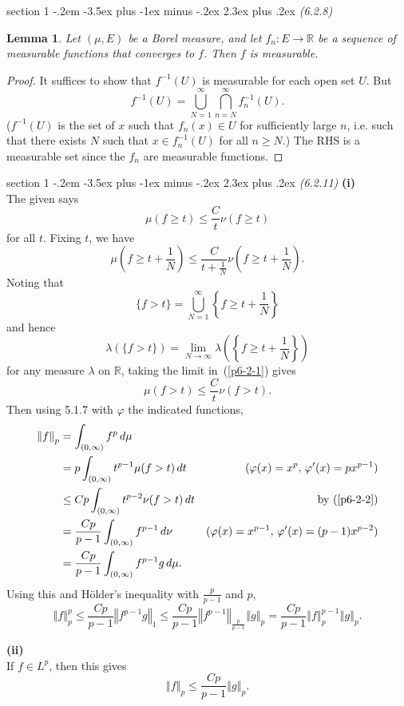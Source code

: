 \documentclass[12pt]{article}
\makeatletter
\theoremstyle{norm}
\newtheorem{lem}[thm]{Lemma}
\newcommand{\R}[0]{\mathbb{R}}
\newcommand{\rc}[1]{\frac{1}{#1}}
\newcommand{\la}[0]{\lambda}
\newcommand{\ph}[0]{\varphi}
\newcommand{\bc}[1]{\left\{ {#1} \right\}}
\newcommand{\pa}[1]{\left( {#1} \right)}
\newcommand{\ve}[1]{\left\Vert {#1}\right\Vert}
\newcommand{\by}[1]{\text{by~(\ref{#1})}}
\newcommand{\subprob}[1]{\noindent\textbf{#1}\\}
\newcommand{\iy}[0]{\infty}
\newenvironment{problem}{\@startsection
       {section}
       {1}
       {-.2em}
       {-3.5ex plus -1ex minus -.2ex}
       {2.3ex plus .2ex}
       {\pagebreak[3]%
       \large\bf\noindent{Problem }
       }
       }
       {%
       }
\makeatother
\begin{document}
\begin{problem}{\it (6.2.8)}
\begin{lem}
Let $(\mu,E)$ be a Borel measure, and let $f_n:E\to \R$ be a sequence of measurable functions that converges to $f$. Then $f$ is measurable.
\end{lem}
\begin{proof}
It suffices to show that $f^{-1}(U)$ is measurable for each open set $U$. But 
\[
f^{-1}(U)=\bigcup_{N=1}^{\iy}\bigcap_{n=N}^{\iy} f_n^{-1}(U).
\]
($f^{-1}(U)$ is the set of $x$ such that $f_n(x)\in U$ for sufficiently large $n$, i.e. such that there exists $N$ such that $x\in f_n^{-1}(U)$ for all $n\ge N$.) The RHS is a measurable set since the $f_n$ are measurable functions. 
\end{proof}
\end{problem}
\begin{problem}{\it (6.2.11)}
\subprob{(i)}
The given says 
\begin{equation}\label{p6-2-0}
\mu(f\ge t)\le \frac Ct\nu(f\ge t)
\end{equation}
for all $t$. Fixing $t$, we have 
\begin{equation}\label{p6-2-1}
\mu(f\ge t+\rc N)\le \frac C{t+\rc N}\nu(f\ge t+\rc N).
\end{equation}
Noting that 
\[\{f>t\}=\bigcup_{N=1}^{\iy} \bc{f\ge t+\rc N}\]
and hence
\[\la(\{f>t\})=\lim_{N\to\iy}\la\pa{\bc{f\ge t+\rc N}}\]
for any measure $\la$ on $\R$, taking the limit in~(\ref{p6-2-1}) gives
\begin{equation}\label{p6-2-2}
\mu(f>t)\le \frac C{t}\nu(f> t).
\end{equation}
Then using 5.1.7 with $\ph$ the indicated functions,
\begin{align*}
\ve{f}_p&=\int_{(0,\iy)} f^p\,d\mu\\
&=p\int_{(0,\iy)}t^{p-1} \mu(f>t)\,dt&(\ph(x)=x^p,\,\ph'(x)=px^{p-1})\\
&\le Cp\int_{(0,\iy)} t^{p-2} \nu(f>t)\,dt&\by{p6-2-2}\\
&=\frac{Cp}{p-1}\int_{(0,\iy)} f^{p-1}\,d\nu&(\ph(x)=x^{p-1},\,\ph'(x)=(p-1)x^{p-2})\\
&=\frac{Cp}{p-1}\int_{(0,\iy)} f^{p-1}g\,d\mu.
\end{align*}
Using this and H\"older's inequality with $\frac{p}{p-1}$ and $p$,
\[
\ve{f}_p^p\le \frac{Cp}{p-1}\ve{f^{p-1}g}_1\le \frac{Cp}{p-1}\ve{f^{p-1}}_{\frac{p}{p-1}}\ve{g}_p=\frac{Cp}{p-1}\ve{f}_{p}^{p-1}\ve{g}_p.
\]

\subprob{(ii)}
If $f\in L^p$, then this gives 
\begin{equation}
\label{p6-2-3}
\ve{f}_p\le \frac{Cp}{p-1}\ve{g}_p.
\end{equation}


\end{problem}
\end{document}
